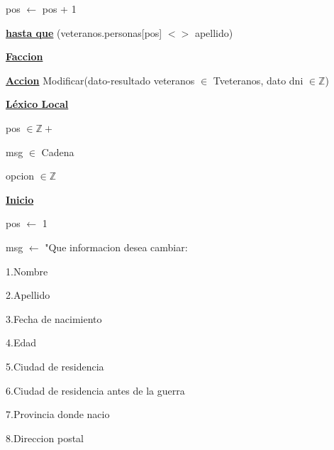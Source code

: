 \documentclass{article}
\begin{document}
                \hspace{16mm}pos $\leftarrow$ pos + 1

            \hspace{12mm}\underline{\textbf{hasta que}} (veteranos.personas[pos] $<>$ apellido)

    \hspace{4mm}\underline{\textbf{Faccion}}

    \vspace{4mm}

    \hspace{4mm}\underline{\textbf{Accion}} Modificar(dato-resultado veteranos $\in$ Tveteranos, dato dni $\in \mathbb{Z}$)

        \hspace{8mm}\underline{\textbf{Léxico Local}}

            \hspace{12mm}pos $\in \mathbb{Z}+$

            \hspace{12mm}msg $\in$ Cadena

            \hspace{12mm}opcion $\in \mathbb{Z}$

        \hspace{8mm}\underline{\textbf{Inicio}}

            \hspace{12mm}pos $\leftarrow$ 1

            \hspace{12mm}msg $\leftarrow$ "Que informacion desea cambiar: 

                \hspace{25mm}1.Nombre

                \hspace{25mm}2.Apellido

                \hspace{25mm}3.Fecha de nacimiento

                \hspace{25mm}4.Edad

                \hspace{25mm}5.Ciudad de residencia
                
                \hspace{25mm}6.Ciudad de residencia antes de la guerra

                \hspace{25mm}7.Provincia donde nacio

                \hspace{25mm}8.Direccion postal
\end{document}
